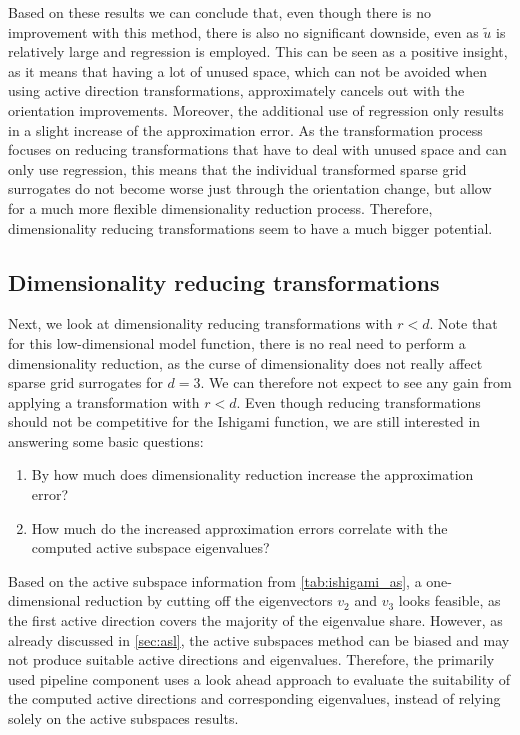 \documentclass[
  a4paper,  %
  twoside,  %
  bibliography=totoc,
  headsepline,
  cleardoublepage=empty,
  parskip=half,
  draft=false
]{scrbook}
\begin{document}
Based on these results we can conclude that, even though there is no improvement with this method, there is also no significant downside, even as $\tilde{u}$ is relatively large and regression is employed.
This can be seen as a positive insight, as it means that having a lot of unused space, which can not be avoided when using active direction transformations, approximately cancels out with the orientation improvements.
Moreover, the additional use of regression only results in a slight increase of the approximation error.
As the transformation process focuses on reducing transformations that have to deal with unused space and can only use regression, this means that the individual transformed sparse grid surrogates do not become worse just through the orientation change, but allow for a much more flexible dimensionality reduction process.
Therefore, dimensionality reducing transformations seem to have a much bigger potential.

\subsection{Dimensionality reducing transformations}

Next, we look at dimensionality reducing transformations with $r < d$.
Note that for this low-dimensional model function, there is no real need to perform a dimensionality reduction, as the curse of dimensionality does not really affect sparse grid surrogates for $d=3$.
We can therefore not expect to see any gain from applying a transformation with $r < d$.
Even though reducing transformations should not be competitive for the Ishigami function, we are still interested in answering some basic questions:
\begin{enumerate}
\item By how much does dimensionality reduction increase the approximation error?
\item How much do the increased approximation errors correlate with the computed active subspace eigenvalues?
\end{enumerate}
%
Based on the active subspace information from \cref{tab:ishigami_as}, a one-dimensional reduction by cutting off the eigenvectors $v_2$ and $v_3$ looks feasible, as the first active direction covers the majority of the eigenvalue share.
However, as already discussed in \cref{sec:asl}, the active subspaces method can be biased and may not produce suitable active directions and eigenvalues.
Therefore, the primarily used pipeline component uses a look ahead approach to evaluate the suitability of the computed active directions and corresponding eigenvalues, instead of relying solely on the active subspaces results.
\end{document}
